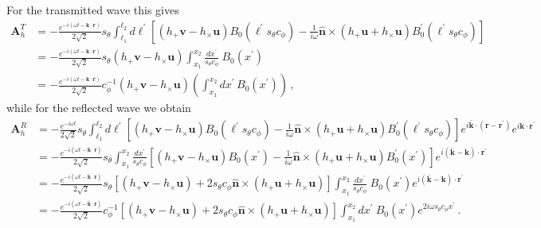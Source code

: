 \documentclass[a4paper,11pt]{article}
\begin{document}
%
For the transmitted wave this gives
%
\begin{equation}
\begin{aligned}
    \bm{A}_{h}^{T} 
    &  = 
-\frac{e^{- i (\omega t - \bm{k} \cdot \bm{r} ) } }{2\sqrt{2}}  s_{\theta} \int_{\ell_{1}}^{\ell_{2}} d\ell^{\prime}  \left[  \left(  h_{+} \bm{v} - h_{\times} \bm{u}  \right)  B_{0}(\ell^{\prime} s_{\theta} c_{\phi})  - \frac{1}{i \omega}  \hat{\bm{n}} \times \left(  h_{+} \bm{u} + h_{\times} \bm{u}  \right)  B_{0}^{\prime}(\ell^{\prime} s_{\theta} c_{\phi})  \right] 
\\
&  = 
-\frac{e^{- i (\omega t - \bm{k} \cdot \bm{r}) }}{2\sqrt{2}}  s_{\theta} \left(  h_{+} \bm{v} - h_{\times} \bm{u}  \right)  \int_{x_{1}}^{x_{2}} \frac{dx^{\prime}}{s_{\theta} c_{\phi}} ~ B_{0}(x^{\prime}) \\ 
 &  = 
-\frac{e^{- i (\omega t - \bm{k} \cdot \bm{r})}}{2\sqrt{2}}   c_{\phi}^{-1}  \left(  h_{+} \bm{v} - h_{\times} \bm{u}  \right) \left( \int_{x_{1}}^{x_{2}} dx^{\prime} \, B_{0}(x^{\prime}) \right) \,,
\end{aligned}    
\end{equation}
%
while for the reflected wave we obtain
%
\begin{equation}
    \begin{aligned}
    \bm{A}_{h}^{R} 
    &  = 
    -\frac{e^{-i \omega t}}{2\sqrt{2}}  s_{\theta} \int_{\ell_{1}}^{\ell_{2}} d\ell^{\prime}  \left[  \left(  h_{+} \bm{v} - h_{\times} \bm{u}  \right)  B_{0}(\ell^{\prime} s_{\theta} c_{\phi})  - \frac{1}{i \omega}  \hat{\bm{n}} \times \left(  h_{+} \bm{u} + h_{\times} \bm{u}  \right)  B_{0}^{\prime}(\ell^{\prime} s_{\theta} c_{\phi})  \right]  e^{i \bar{\bm{k}} \cdot ( \bm{r} - \bm{r}^{\prime} )}   e^{ i \bm{k} \cdot {\bm r}^{\prime} }  \\ 
     &  = 
    -\frac{e^{- i (\omega t - \bar{\bm{k}} \cdot \bm{r}) }}{2\sqrt{2}}  s_{\theta}  \int_{x_{1}}^{x_{2}} \frac{dx^{\prime}}{s_{\theta} c_{\phi}} \left[  \left(  h_{+} \bm{v} - h_{\times} \bm{u}  \right)  B_{0}(x^{\prime})  - \frac{1}{i \omega}  \hat{\bm{n}} \times \left(  h_{+} \bm{u} + h_{\times} \bm{u}  \right)  B_{0}^{\prime}(x^{\prime})  \right] e^{i (\bar{\bm k} - \bm k) \cdot \bm{r}^{\prime}}  \\ 
     &  = 
    -\frac{e^{- i (\omega t - \bar{\bm{k}} \cdot \bm{r}) }}{2\sqrt{2}}  s_{\theta}
    \left[  \left(  h_{+} \bm{v} - h_{\times} \bm{u}  \right)  + 2 s_{\theta} c_{\phi}   \hat{\bm{n}} \times \left(  h_{+} \bm{u} + h_{\times} \bm{u}  \right)  \right] \int_{x_{1}}^{x_{2}} \frac{dx^{\prime}}{s_{\theta} c_{\phi}} ~  B_{0}(x^{\prime}) e^{i (\bar{\bm k} - \bm k) \cdot \bm{r}^{\prime}} 
    \\ 
     &  = 
    -\frac{e^{- i (\omega t - \bar{\bm{k}} \cdot \bm{r})}}{2\sqrt{2} }   c_{\phi}^{-1} \left[  \left(  h_{+} \bm{v} - h_{\times} \bm{u}  \right)  + 2 s_{\theta} c_{\phi} \hat{\bm{n}} \times \left(  h_{+} \bm{u} + h_{\times} \bm{u}  \right)  \right] \int_{x_{1}}^{x_{2}} dx^{\prime} ~  B_{0}(x^{\prime}) e^{2 i \omega s_{\theta} c_{\phi} x^{\prime}}  \,.
    \end{aligned}
\end{equation}
%
\end{document}
